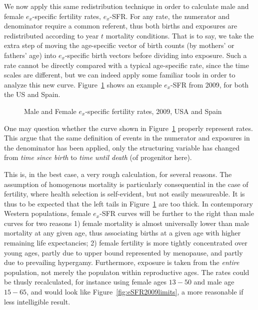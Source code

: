 We now apply this same redistribution technique in order to
calculate male and female $e_x$-specific fertility rates, $e_x$-SFR. For any
rate, the numerator and denominator require a common referent, thus both births and
exposures are redistributed according to year $t$ mortality conditions. That
is to say, we take the extra step of moving the age-specific vector
of birth counts (by mothers' or fathers' age) into $e_x$-specific birth
vectors before dividing into exposure. Such a rate cannot be directly compared
with a typical age-specific rate, since the time scales are different, but we 
can indeed apply some familiar tools in order to analyze this new curve. 
Figure~\ref{fig:eSFR2009} shows an example $e_x$-SFR from 2009, for both the US and Spain.

\begin{figure}[ht!]
        \centering  
          \caption{Male and Female $e_x$-specific fertility rates, 2009, USA and
          Spain}
          \label{fig:eSFR2009}
\end{figure}

One may question whether the curve shown in Figure~\ref{fig:eSFR2009} properly
represent rates. This argue that the same definition of events in the
numerator and exposures in the denominator has been applied, only the
structuring variable has changed from \textit{time since birth} to \textit{time
until death} (of progenitor here).

This is, in the best case, a very rough calculation, for several reasons. The
assumption of homogenous mortality is particularly consequential in the case of 
fertility, where health selection is self-evident, but not easily measureable.
It is thus to be expected that the left tails in Figure~\ref{fig:eSFR2009} are
too thick. In contemporary Western populations, female $e_x$-SFR curves will be
further to the right than male curves for two reasons 1) female mortality is
almost universally lower than male mortality at any given age, thus associating
births at a given age with higher remaining life expectancies; 2)
female fertility is more tightly concentrated over young ages, partly due to
upper bound represented by menopause, and partly due to prevailing hypergamy.
Furthermore, exposure is taken from the \textit{entire} population, not merely
the populaton within reproductive ages. The rates could be thusly recalculated,
for instance using female ages $13-50$ and male age $15-65$, and would look like 
Figure~\ref{fig:eSFR2009limits}, a more reasonable if less intelligible result.

